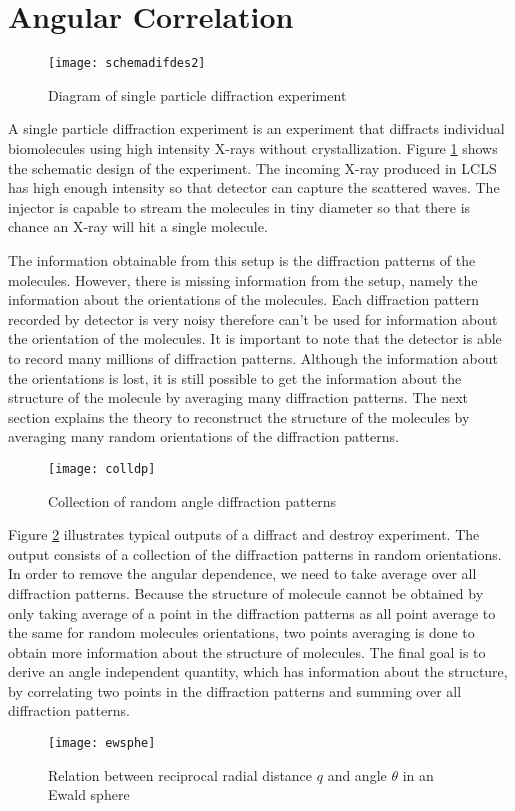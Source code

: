 \section{Angular Correlation} \label{sec:angcor}
\begin{figure}[ht]
  \centering
  \texttt{[image: schemadifdes2]}
\caption{Diagram of single particle diffraction experiment}
\label{fig:spiexp}
\end{figure}
A single particle diffraction experiment is an experiment that diffracts individual biomolecules using high intensity X-rays without crystallization. Figure \ref{fig:spiexp} shows the schematic design of the experiment.  The incoming X-ray produced in LCLS has high enough intensity so that detector can capture the scattered waves. The injector is capable to stream the molecules in tiny diameter so that there is chance an X-ray will hit a single molecule. 

The information obtainable from this setup is the diffraction patterns of the molecules. However, there is missing information from the setup, namely the information about the orientations of the molecules. Each diffraction pattern recorded by detector is very noisy therefore can't be used for information about the orientation of the molecules. It is important to note that the detector is able to record many millions of diffraction patterns. Although the information about the orientations is lost, it is still possible to get the information about the structure of the molecule by averaging many diffraction patterns. The next section explains the theory to reconstruct the structure of the molecules by averaging many random orientations of the diffraction patterns.  

\begin{figure}[ht]
  \centering
  \texttt{[image: colldp]}
\caption{Collection of random angle diffraction patterns}
\label{fig:colldp}
\end{figure}
Figure \ref{fig:colldp} illustrates typical outputs of a diffract and destroy experiment. The output consists of a collection of the diffraction patterns in random orientations. In order to remove the angular dependence, we need to take average over all diffraction patterns. Because the structure of molecule cannot be obtained by only taking average of a point in the diffraction patterns as all point average to the same for random molecules orientations, two points averaging is done to obtain more information about the structure of molecules. The final goal is to derive an angle independent quantity, which has information about the structure, by correlating two points in the diffraction patterns and summing over all diffraction patterns.
\begin{figure}[ht]
  \centering
  \texttt{[image: ewsphe]}
\caption{Relation between reciprocal radial distance $q$ and angle $\theta$ in an Ewald sphere \cite{saldin2009} }
\label{fig:ewrelation}
\end{figure}

